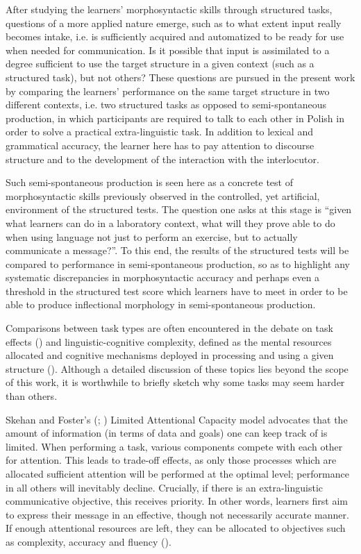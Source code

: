 After studying the learners’ morphosyntactic skills through structured tasks, questions of a more applied nature emerge, such as to what extent input really becomes intake, i.e. is sufficiently acquired and automatized to be ready for use when needed for communication. Is it possible that input is assimilated to a degree sufficient to use the target structure in a given context (such as a structured task), but not others? These questions are pursued in the present work by comparing the learners’ performance on the same target structure in two different contexts, i.e. two structured tasks as opposed to semi-spontaneous production, in which participants are required to talk to each other in Polish in order to solve a practical extra-linguistic task. In addition to lexical and grammatical accuracy, the learner here has to pay attention to discourse structure and to the development of the interaction with the interlocutor.

Such semi-spontaneous production is seen here as a concrete test of morphosyntactic skills previously observed in the controlled, yet artificial, environment of the structured tests. The question one asks at this stage is “given what learners can do in a laboratory context, what will they prove able to do when using language not just to perform an exercise, but to actually communicate a message?”. To this end, the results of the structured tests will be compared to performance in semi-spontaneous production, so as to highlight any systematic discrepancies in morphosyntactic accuracy and perhaps even a threshold in the structured test score which learners have to meet in order to be able to produce inflectional morphology in semi-spontaneous production. 

Comparisons between task types are often encountered in the debate on task effects (\citealt{RévészMichelEtAl2016, PlonskyKim2016, Sasayama2016}) and linguistic-cognitive complexity, defined as the mental resources allocated and cognitive mechanisms deployed in processing and using a given structure (\citealt{HousenSimoens2016}). Although a detailed discussion of these topics lies beyond the scope of this work, it is worthwhile to briefly sketch why some tasks may seem harder than others. 

Skehan and Foster’s (\citealt{Skehan2009}; \citealt{SkehanFoster2001}) Limited Attentional Capacity model advocates that the amount of information (in terms of data and goals) one can keep track of is limited. When performing a task, various components compete with each other for attention. This leads to trade-off effects, as only those processes which are allocated sufficient attention will be performed at the optimal level; performance in all others will inevitably decline. Crucially, if there is an extra-linguistic communicative objective, this receives priority. In other words, learners first aim to express their message in an effective, though not necessarily accurate manner. If enough attentional resources are left, they can be allocated to objectives such as complexity, accuracy and fluency (\citealt{SkehanFoster2007}). 

